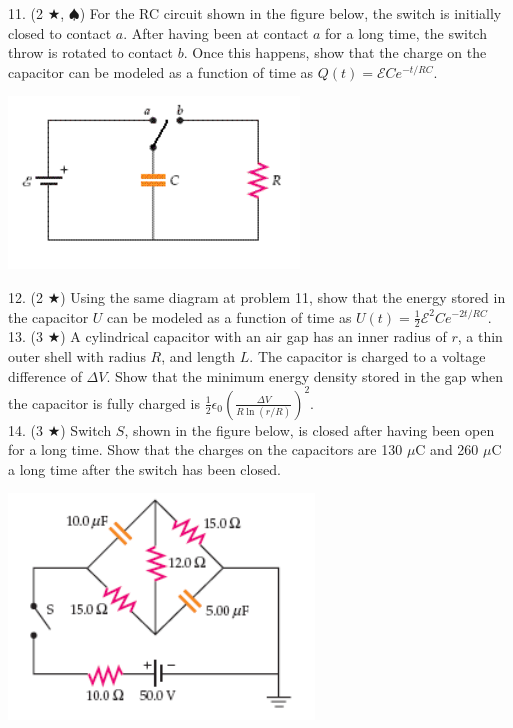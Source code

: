 11. (2 $\bigstar$, $\spadesuit$) For the RC circuit shown in the figure below, the switch is initially closed to contact $a$. After having been at contact $a$ for a long time, the switch
throw is rotated to contact $b$. Once this happens, show that the charge on the capacitor can be modeled as a function of time as $Q(t) = \mathscr{E}Ce^{-t/RC}$.
\begin{center}
	\includegraphics[scale=0.7]{images/em/RC-problem2.png}
\end{center}
12. (2 $\bigstar$) Using the same diagram at problem 11, show that the energy stored in the capacitor $U$ can be modeled as a function of time as $U(t) = \frac{1}{2}\mathscr{E}^2Ce^{-2t/RC}$.\\
13. (3 $\bigstar$) A cylindrical capacitor with an air gap has an inner radius of $r$, a thin outer shell with radius $R$, and length $L$. The capacitor is charged to a voltage difference of $\Delta V$. Show that the minimum energy density stored in the gap when the capacitor is fully charged is $\frac{1}{2} \epsilon_0 \left(\frac{\Delta V}{R\ln(r/R)} \right)^2$. \\
14. (3 $\bigstar$) Switch $S$, shown in the figure below, is closed after having been open for a long time. Show that the charges on the capacitors are 130 $\mu$C and 260 $\mu$C a long time after the switch has been closed. 
\begin{center}
	\includegraphics[scale=0.7]{images/em/RC-problem4.png}
\end{center}
\pagebreak